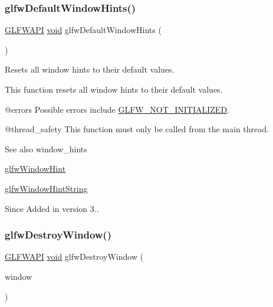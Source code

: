 \subsubsection{\texorpdfstring{glfwDefaultWindowHints()}{glfwDefaultWindowHints()}}
{\footnotesize\ttfamily \mbox{\hyperlink{glfw3_8h_a56da5036b2cc259351ae22fd6439bb47}{G\+L\+F\+W\+A\+PI}} \mbox{\hyperlink{glad_8h_a950fc91edb4504f62f1c577bf4727c29}{void}} glfw\+Default\+Window\+Hints (\begin{DoxyParamCaption}\item[{\mbox{\hyperlink{glad_8h_a950fc91edb4504f62f1c577bf4727c29}{void}}}]{ }\end{DoxyParamCaption})}



Resets all window hints to their default values. 

This function resets all window hints to their default values.

@errors Possible errors include \mbox{\hyperlink{group__errors_ga2374ee02c177f12e1fa76ff3ed15e14a}{G\+L\+F\+W\+\_\+\+N\+O\+T\+\_\+\+I\+N\+I\+T\+I\+A\+L\+I\+Z\+ED}}.

@thread\+\_\+safety This function must only be called from the main thread.

\begin{DoxySeeAlso}{See also}
window\+\_\+hints 

\mbox{\hyperlink{group__window_ga69c40728499720bef8a49aa925ea0efa}{glfw\+Window\+Hint}} 

\mbox{\hyperlink{group__window_ga3c2270562d7ba13d92680ba1090adafe}{glfw\+Window\+Hint\+String}}
\end{DoxySeeAlso}
\begin{DoxySince}{Since}
Added in version 3.. 
\end{DoxySince}
\mbox{\label{group__window_ga806747476b7247d292be3711c323ea10}} 
\subsubsection{\texorpdfstring{glfwDestroyWindow()}{glfwDestroyWindow()}}
{\footnotesize\ttfamily \mbox{\hyperlink{glfw3_8h_a56da5036b2cc259351ae22fd6439bb47}{G\+L\+F\+W\+A\+PI}} \mbox{\hyperlink{glad_8h_a950fc91edb4504f62f1c577bf4727c29}{void}} glfw\+Destroy\+Window (\begin{DoxyParamCaption}\item[{\mbox{\hyperlink{group__window_ga3c96d80d363e67d13a41b5d1821f3242}{G\+L\+F\+Wwindow}} $\ast$}]{window }\end{DoxyParamCaption})}



